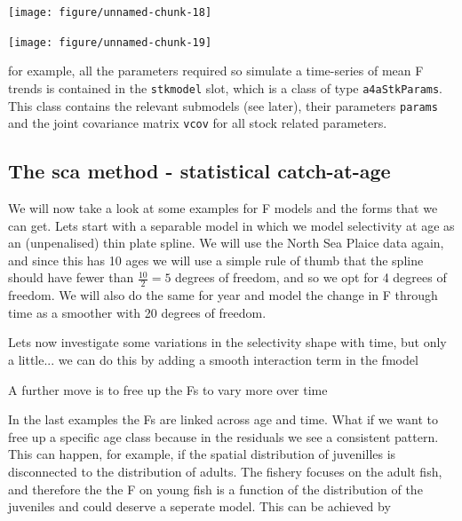 \documentclass[a4paper,english,10pt]{article}\usepackage[]{graphicx}\usepackage[]{color}
\newenvironment{knitrout}{}{} %
\begin{document}
\begin{knitrout}
\color{fgcolor}

{\centering \texttt{[image: figure/unnamed-chunk-18]} 

}



\end{knitrout}


\begin{knitrout}
\color{fgcolor}

{\centering \texttt{[image: figure/unnamed-chunk-19]} 

}



\end{knitrout}


for example, all the parameters required so simulate a time-series of mean F trends is contained in the \texttt{stkmodel} slot, which is a class of type \texttt{a4aStkParams}.  This class contains the relevant submodels (see later), their parameters \texttt{params} and the joint covariance matrix \texttt{vcov} for all stock related parameters.

\subsection{The sca method - statistical catch-at-age}

We will now take a look at some examples for F models and the forms that we can get.  Lets start with a separable model in which we model selectivity at age as an (unpenalised) thin plate spline.  We will use the North Sea Plaice data again, and since this has 10 ages we will use a simple rule of thumb that the spline should have fewer than $\frac{10}{2} = 5$ degrees of freedom, and so we opt for 4 degrees of freedom.  We will also do the same for year and model the change in F through time as a smoother with 20 degrees of freedom.

Lets now investigate some variations in the selectivity shape with time, but only a little... we can do this by adding a smooth interaction term in the fmodel

A further move is to free up the Fs to vary more over time

In the last examples the Fs are linked across age and time.  What if we want to free up a specific age class because in the residuals we see a consistent pattern.  This can happen, for example, if the spatial distribution of juvenilles is disconnected to the distribution of adults.  The fishery focuses on the adult fish, and therefore the the F on young fish is a function of the distribution of the juveniles and could deserve a seperate model.  This can be achieved by
\end{document}
